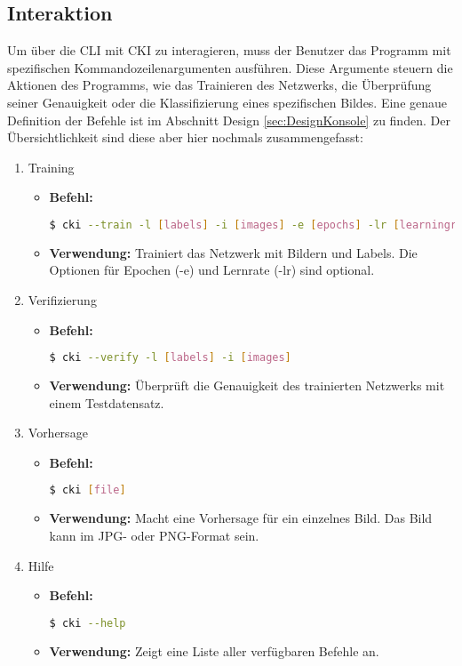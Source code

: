 \subsection{Interaktion}
\label{sec:UsageInteraktion}
Um über die CLI mit CKI zu interagieren, muss der Benutzer das Programm mit spezifischen Kommandozeilenargumenten ausführen. Diese Argumente steuern die Aktionen des Programms, wie das Trainieren des Netzwerks, die Überprüfung seiner Genauigkeit oder die Klassifizierung eines spezifischen Bildes.  Eine genaue Definition der Befehle ist im Abschnitt Design \ref{sec:DesignKonsole} zu finden.
Der Übersichtlichkeit sind diese aber hier nochmals zusammengefasst:
\begin{enumerate}
	\item Training
				\begin{itemize}
					\item \textbf{Befehl:} 
								\begin{lstlisting}[language=bash]
$ cki --train -l [labels] -i [images] -e [epochs] -lr [learningrate]
								\end{lstlisting}
					\item \textbf{Verwendung:} Trainiert das Netzwerk mit Bildern und Labels. Die Optionen für Epochen (-e) und Lernrate (-lr) sind optional.
				\end{itemize}
	\item Verifizierung
				\begin{itemize}
					\item \textbf{Befehl:}
								\begin{lstlisting}[language=bash]
$ cki --verify -l [labels] -i [images]
								\end{lstlisting}
					\item \textbf{Verwendung:} Überprüft die Genauigkeit des trainierten Netzwerks mit einem Testdatensatz.
				\end{itemize}
	\item Vorhersage
				\begin{itemize}
					\item \textbf{Befehl:}
								\begin{lstlisting}[language=bash]
$ cki [file]
								\end{lstlisting}
					\item \textbf{Verwendung:} Macht eine Vorhersage für ein einzelnes Bild. Das Bild kann im JPG- oder PNG-Format sein.
				\end{itemize}
	\item Hilfe
				\begin{itemize}
					\item \textbf{Befehl:}
								\begin{lstlisting}[language=bash]
$ cki --help
								\end{lstlisting}
					\item \textbf{Verwendung:} Zeigt eine Liste aller verfügbaren Befehle an.
				\end{itemize}
\end{enumerate}